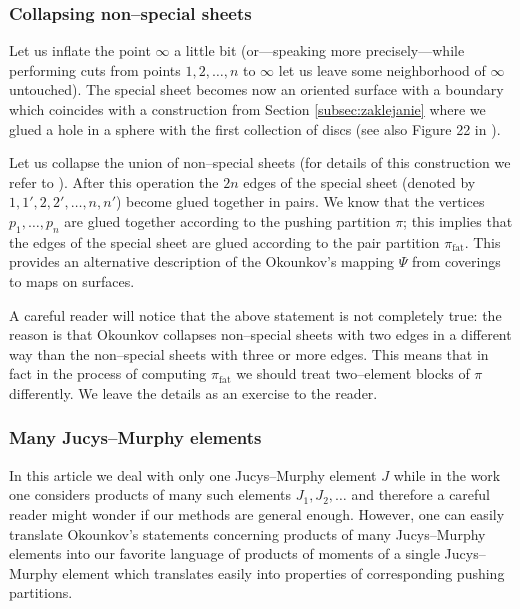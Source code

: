 \documentclass[12pt,dvips]{amsart}
\numberwithin{equation}{section} \numberwithin{figure}{section}
\theoremstyle{plain}
\theoremstyle{definition}
\theoremstyle{remark}
\DeclareMathOperator{\fat}{fat}
\begin{document}
\subsubsection{Collapsing non--special sheets}
\label{subsec:collapsing} Let us inflate the point $\infty$ a little
bit (or---speaking more precisely---while performing cuts from
points $1,2,\dots,n$ to $\infty$ let us leave some neighborhood of
$\infty$ untouched). The special sheet becomes now an oriented
surface with a boundary which coincides with a construction from
Section \ref{subsec:zaklejanie} where we glued a hole in a sphere
with the first collection of discs
(see also Figure 22 in \cite{Okounkov2000randompermutations}).

Let us collapse the union of non--special sheets (for details of
this construction we refer to
\cite{Okounkov2000randompermutations}). After this operation the
$2n$ edges of the special sheet (denoted by $1,1',2,2',\dots,n,n'$)
become glued together in pairs. We know that the vertices
$p_1,\dots,p_n$ are glued together according to the pushing
partition $\pi$;  this implies that the edges of the special sheet
are glued according to the pair partition $\pi_{\fat}$. This
provides an alternative description of the Okounkov's mapping $\Psi$
from coverings to maps on surfaces.

A careful reader will notice that the above statement is not
completely true: the reason is that Okounkov collapses non--special
sheets with two edges in a different way than the non--special
sheets with three or more edges. This means that in fact in the
process of computing $\pi_{\fat}$ we should treat two--element
blocks of $\pi$ differently. We leave the details as an exercise to
the reader.





\subsubsection{Many Jucys--Murphy elements}
In this article we deal with only one Jucys--Murphy element $J$
while in the work \cite{Okounkov2000randompermutations} one
considers products of many such elements $J_1,J_2,\dots$ and
therefore a careful reader might wonder if our methods are general
enough. However, one can easily translate Okounkov's statements
concerning products of many Jucys--Murphy elements into our favorite
language of products of moments of a single Jucys--Murphy element
which translates easily into properties of corresponding pushing
partitions.
\end{document}
